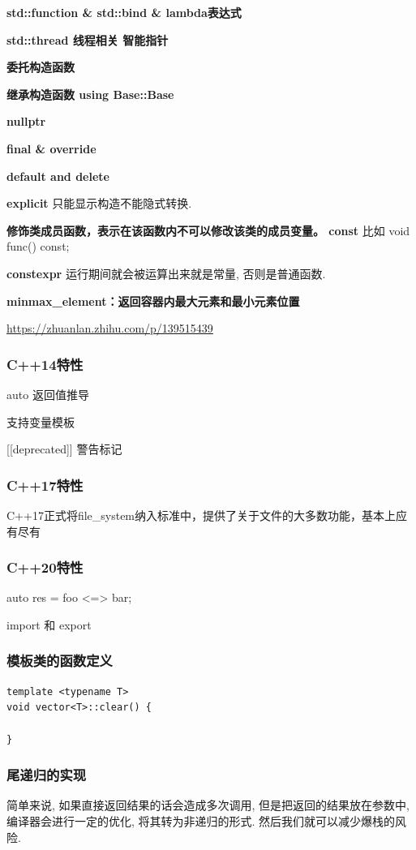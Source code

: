 \textbf{std::function \& std::bind \& lambda表达式}

\textbf{std::thread 线程相关 智能指针}


\textbf{委托构造函数}

\textbf{继承构造函数 using Base::Base}

\textbf{nullptr}

\textbf{final \& override}

\textbf{default and delete}

\textbf{explicit} 只能显示构造不能隐式转换.

\textbf{修饰类成员函数，表示在该函数内不可以修改该类的成员变量。 const } 比如  void func() const;

\textbf{constexpr } 运行期间就会被运算出来就是常量, 否则是普通函数.

\textbf{minmax\_element：返回容器内最大元素和最小元素位置}

\url{https://zhuanlan.zhihu.com/p/139515439}

\subsubsection{C++14特性}

auto 返回值推导

支持变量模板

[[deprecated]] 警告标记

\subsubsection{C++17特性}

C++17正式将file\_system纳入标准中，提供了关于文件的大多数功能，基本上应有尽有

\subsubsection{C++20特性}

auto res = foo <=> bar;

import 和 export

\subsubsection{模板类的函数定义}
\begin{lstlisting}
template <typename T>
void vector<T>::clear() {
	
}
\end{lstlisting}
\subsubsection{尾递归的实现}
简单来说, 如果直接返回结果的话会造成多次调用, 但是把返回的结果放在参数中, 编译器会进行一定的优化, 将其转为非递归的形式. 然后我们就可以减少爆栈的风险.

